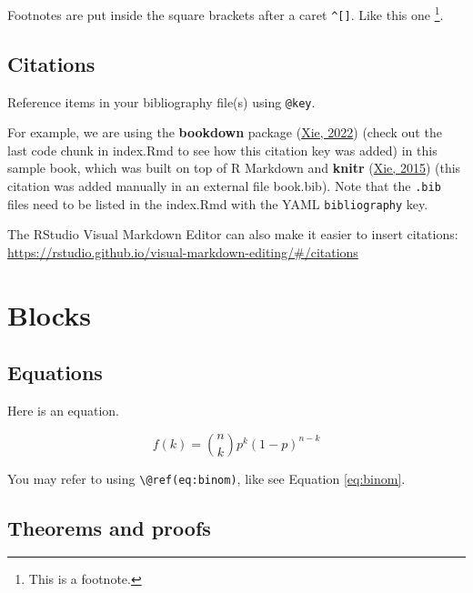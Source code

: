 \documentclass[
  11pt,
  twoside]{book}
\theoremstyle{definition}
\theoremstyle{definition}
\theoremstyle{definition}
\theoremstyle{definition}
\theoremstyle{remark}
\begin{document}
Footnotes are put inside the square brackets after a caret \texttt{\^{}{[}{]}}. Like this one \footnote{This is a footnote.}.

\hypertarget{citations}{%
\section{Citations}\label{citations}}

Reference items in your bibliography file(s) using \texttt{@key}.

For example, we are using the \textbf{bookdown} package (\protect\hyperlink{ref-R-bookdown}{Xie, 2022}) (check out the last code chunk in index.Rmd to see how this citation key was added) in this sample book, which was built on top of R Markdown and \textbf{knitr} (\protect\hyperlink{ref-xie2015}{Xie, 2015}) (this citation was added manually in an external file book.bib).
Note that the \texttt{.bib} files need to be listed in the index.Rmd with the YAML \texttt{bibliography} key.

The RStudio Visual Markdown Editor can also make it easier to insert citations: \url{https://rstudio.github.io/visual-markdown-editing/\#/citations}

\hypertarget{blocks}{%
\chapter*{Blocks}\label{blocks}}

\hypertarget{equations}{%
\section{Equations}\label{equations}}

Here is an equation. 

\begin{equation} 
  f\left(k\right) = \binom{n}{k} p^k\left(1-p\right)^{n-k}
  \label{eq:binom}
\end{equation}

You may refer to using \texttt{\textbackslash{}@ref(eq:binom)}, like see Equation \eqref{eq:binom}.

\hypertarget{theorems-and-proofs}{%
\section{Theorems and proofs}\label{theorems-and-proofs}}
\end{document}
